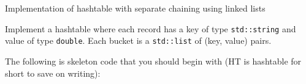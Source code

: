 Implementation of hashtable with separate chaining using
linked lists

Implement a hashtable where each record has a key of type 
\verb!std::string! and value of type \verb!double!.
Each bucket is a \verb!std::list! of (key, value) pairs.

The following is skeleton code that you should begin with (HT is hashtable for short
to save on writing):

